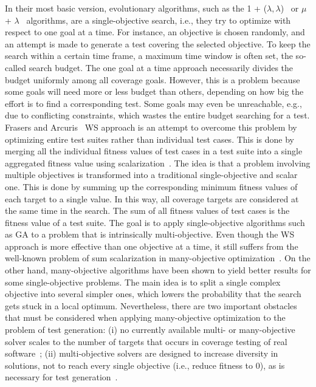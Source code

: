 \documentclass{article}
\begin{document}
In their most basic version, evolutionary algorithms, such as the 1 + ($\lambda,\lambda$)~\cite{Doerr2015} or $\mu$ + $\lambda$~\cite{TerSarkisov2011} algorithms, are a single-objective search, i.e., they try to optimize with respect to one goal at a time. For instance, an objective is chosen randomly, and an attempt is made to generate a test covering the selected objective. To keep the search within a certain time frame, a maximum time window is often set, the so-called search budget. The one goal at a time approach necessarily divides the budget uniformly among all coverage goals. However, this is a problem because some goals will need more or less budget than others, depending on how big the effort is to find a corresponding test. Some goals may even be unreachable, e.g., due to conflicting constraints, which wastes the entire budget searching for a test. Frasers and Arcuris~\cite{Fraser_2013} \ac{WS} approach is an attempt to overcome this problem by optimizing entire test suites rather than individual test cases. This is done by merging all the individual fitness values of test cases in a test suite into a single aggregated fitness value using scalarization~\cite{Deb2014}. The idea is that a problem involving multiple objectives is transformed into a traditional single-objective and scalar one. This is done by summing up the corresponding minimum fitness values of each target to a single value. In this way, all coverage targets are considered at the same time in the search. The sum of all fitness values of test cases is the fitness value of a test suite. The goal is to apply single-objective algorithms such as \ac{GA} to a problem that is intrinsically multi-objective. Even though the \ac{WS} approach is more effective than one objective at a time, it still suffers from the well-known problem of sum scalarization in many-objective optimization~\cite{Deb2014}. On the other hand, many-objective algorithms have been shown to yield better results for some single-objective problems. The main idea is to split a single complex objective into several simpler ones, which lowers the probability that the search gets stuck in a local optimum. Nevertheless, there are two important obstacles that must be considered when applying many-objective optimization to the problem of test generation: (i) no currently available multi- or many-objective solver scales to the number of targets that occurs in coverage testing of real software~\cite{Arcuri_2014}; (ii) multi-objective solvers are designed to increase diversity in solutions, not to reach every single objective (i.e., reduce fitness to 0), as is necessary for test generation~\cite{Panichella2018}.
\end{document}
